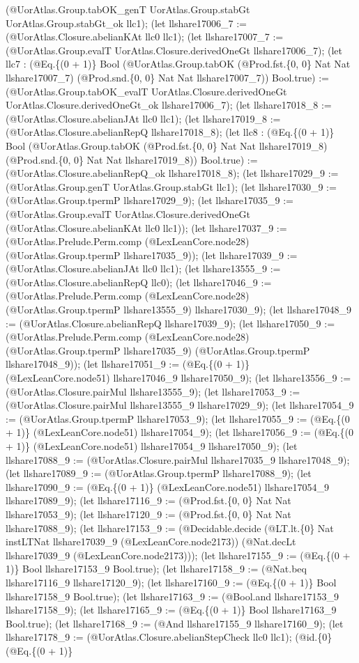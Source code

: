 \documentclass[11pt]{article}
\begin{document}
(@UorAtlas.Group.tabOK\_genT UorAtlas.Group.stabGt UorAtlas.Group.stabGt\_ok llc1); (let llshare17006\_7 := (@UorAtlas.Closure.abelianKAt llc0 llc1); (let llshare17007\_7 := (@UorAtlas.Group.evalT UorAtlas.Closure.derivedOneGt llshare17006\_7); (let llc7 : (@Eq.\{(0 + 1)\} Bool (@UorAtlas.Group.tabOK (@Prod.fst.\{0, 0\} Nat Nat llshare17007\_7) (@Prod.snd.\{0, 0\} Nat Nat llshare17007\_7)) Bool.true) := (@UorAtlas.Group.tabOK\_evalT UorAtlas.Closure.derivedOneGt UorAtlas.Closure.derivedOneGt\_ok llshare17006\_7); (let llshare17018\_8 := (@UorAtlas.Closure.abelianJAt llc0 llc1); (let llshare17019\_8 := (@UorAtlas.Closure.abelianRepQ llshare17018\_8); (let llc8 : (@Eq.\{(0 + 1)\} Bool (@UorAtlas.Group.tabOK (@Prod.fst.\{0, 0\} Nat Nat llshare17019\_8) (@Prod.snd.\{0, 0\} Nat Nat llshare17019\_8)) Bool.true) := (@UorAtlas.Closure.abelianRepQ\_ok llshare17018\_8); (let llshare17029\_9 := (@UorAtlas.Group.genT UorAtlas.Group.stabGt llc1); (let llshare17030\_9 := (@UorAtlas.Group.tpermP llshare17029\_9); (let llshare17035\_9 := (@UorAtlas.Group.evalT UorAtlas.Closure.derivedOneGt (@UorAtlas.Closure.abelianKAt llc0 llc1)); (let llshare17037\_9 := (@UorAtlas.Prelude.Perm.comp (@LexLeanCore.node28) (@UorAtlas.Group.tpermP llshare17035\_9)); (let llshare17039\_9 := (@UorAtlas.Closure.abelianJAt llc0 llc1); (let llshare13555\_9 := (@UorAtlas.Closure.abelianRepQ llc0); (let llshare17046\_9 := (@UorAtlas.Prelude.Perm.comp (@LexLeanCore.node28) (@UorAtlas.Group.tpermP llshare13555\_9) llshare17030\_9); (let llshare17048\_9 := (@UorAtlas.Closure.abelianRepQ llshare17039\_9); (let llshare17050\_9 := (@UorAtlas.Prelude.Perm.comp (@LexLeanCore.node28) (@UorAtlas.Group.tpermP llshare17035\_9) (@UorAtlas.Group.tpermP llshare17048\_9)); (let llshare17051\_9 := (@Eq.\{(0 + 1)\} (@LexLeanCore.node51) llshare17046\_9 llshare17050\_9); (let llshare13556\_9 := (@UorAtlas.Closure.pairMul llshare13555\_9); (let llshare17053\_9 := (@UorAtlas.Closure.pairMul llshare13555\_9 llshare17029\_9); (let llshare17054\_9 := (@UorAtlas.Group.tpermP llshare17053\_9); (let llshare17055\_9 := (@Eq.\{(0 + 1)\} (@LexLeanCore.node51) llshare17054\_9); (let llshare17056\_9 := (@Eq.\{(0 + 1)\} (@LexLeanCore.node51) llshare17054\_9 llshare17050\_9); (let llshare17088\_9 := (@UorAtlas.Closure.pairMul llshare17035\_9 llshare17048\_9); (let llshare17089\_9 := (@UorAtlas.Group.tpermP llshare17088\_9); (let llshare17090\_9 := (@Eq.\{(0 + 1)\} (@LexLeanCore.node51) llshare17054\_9 llshare17089\_9); (let llshare17116\_9 := (@Prod.fst.\{0, 0\} Nat Nat llshare17053\_9); (let llshare17120\_9 := (@Prod.fst.\{0, 0\} Nat Nat llshare17088\_9); (let llshare17153\_9 := (@Decidable.decide (@LT.lt.\{0\} Nat instLTNat llshare17039\_9 (@LexLeanCore.node2173)) (@Nat.decLt llshare17039\_9 (@LexLeanCore.node2173))); (let llshare17155\_9 := (@Eq.\{(0 + 1)\} Bool llshare17153\_9 Bool.true); (let llshare17158\_9 := (@Nat.beq llshare17116\_9 llshare17120\_9); (let llshare17160\_9 := (@Eq.\{(0 + 1)\} Bool llshare17158\_9 Bool.true); (let llshare17163\_9 := (@Bool.and llshare17153\_9 llshare17158\_9); (let llshare17165\_9 := (@Eq.\{(0 + 1)\} Bool llshare17163\_9 Bool.true); (let llshare17168\_9 := (@And llshare17155\_9 llshare17160\_9); (let llshare17178\_9 := (@UorAtlas.Closure.abelianStepCheck llc0 llc1); (@id.\{0\} (@Eq.\{(0 + 1)\} 
\end{document}
